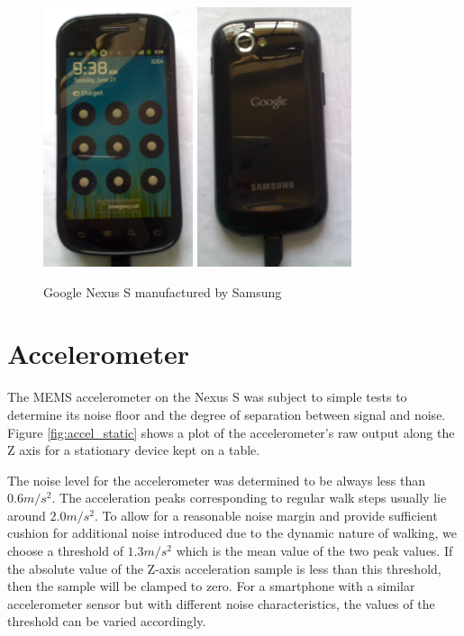 \begin{figure}
\centering
    \includegraphics[height=3in]{figures/android_front}
    \includegraphics[height=3in]{figures/android_back}
\caption{Google Nexus S manufactured by Samsung}
\end{figure}



\section{Accelerometer}

The MEMS accelerometer on the Nexus S was subject to simple tests to determine 
its noise floor and the degree of separation between signal and noise.
Figure \ref{fig:accel_static} shows a plot of the accelerometer's raw output 
along the Z axis for a stationary device kept on a table. 

The noise level for the accelerometer was determined to be always less
than $0.6 m/s^2$. The acceleration peaks corresponding to regular walk steps 
usually lie around $2.0 m/s^2$. To allow for a reasonable noise margin and provide
sufficient cushion for additional noise introduced due to the dynamic nature of
walking, we choose a threshold of $1.3 m/s^2$ which is the mean value of the two
peak values. If the absolute value of the Z-axis acceleration sample is less
than this threshold, then the sample will be clamped to zero. For a smartphone
with a similar accelerometer sensor but with different noise characteristics,
the values of the threshold can be varied accordingly. 


